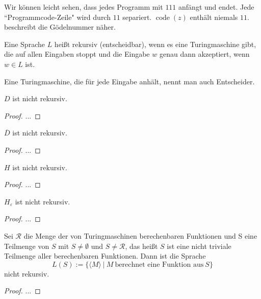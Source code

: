 \documentclass[journal]{IEEEtran}
\begin{document}
Wir können leicht sehen, dass jedes Programm mit $111$ anfängt und endet. Jede ``Programmcode-Zeile" wird durch $11$ separiert. $\operatorname{code}(z)$ enthält niemals $11$. \cite{Wegener2013:2.4} beschreibt die Gödelnummer näher.

\begin{definition}[Entscheidbarkeit]
  Eine Sprache $L$ heißt rekursiv (entscheidbar), wenn es eine Turingmaschine gibt, die auf allen Eingaben stoppt und die Eingabe $w$ genau dann akzeptiert, wenn $w \in L$ ist.~\cite{Wegener2013:2.1.2}
\end{definition}

Eine Turingmaschine, die für jede Eingabe anhält, nennt man auch Entscheider.

\begin{theorem}
  $D$ ist nicht rekursiv.
\end{theorem}
\begin{proof}
  ...
\end{proof}

\begin{corollar}
  $\overline{D}$ ist nicht rekursiv.
\end{corollar}
\begin{proof}
  ...
\end{proof}

\begin{theorem}
  $H$ ist nicht rekursiv.
\end{theorem}
\begin{proof}
  ...
\end{proof}

\begin{theorem}
  $H_\varepsilon$ ist nicht rekursiv.
\end{theorem}
\begin{proof}
  ...
\end{proof}

\begin{theorem}
  Sei $\mathcal{R}$ die Menge der von Turingmaschinen berechenbaren Funktionen und S eine Teilmenge von $S$  mit $S \ne \emptyset$ und $S \ne \mathcal{R}$, das heißt $S$ ist eine nicht triviale Teilmenge aller berechenbaren Funktionen. Dann ist die Sprache
  \begin{equation*}
    L(S) := \{\langle M \rangle \ \vert \ M \ \text{berechnet eine Funktion aus} \ S\}
  \end{equation*}
  nicht rekursiv.
\end{theorem}
\begin{proof}
  ...
\end{proof}
\end{document}

